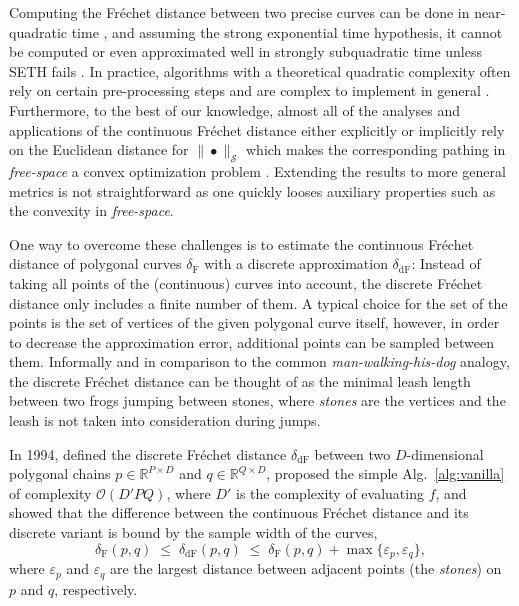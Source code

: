 Computing the Fr\'echet distance between two precise curves can be done in near-quadratic time \citep{agarwal14,alt95,buchin17}, and assuming the strong exponential time hypothesis, it cannot be computed or even approximated well in strongly subquadratic time unless SETH fails \citep{bringmann14,buchin19a}.
In practice, algorithms with a theoretical quadratic complexity often rely on certain pre-processing steps and are complex to implement in general \citep{bringmann19}.
Furthermore, to the best of our knowledge, almost all of the analyses and applications of the continuous Fr\'echet distance either explicitly or implicitly rely on the Euclidean distance for $\| \bullet \|_\mathcal{S}$ which makes the corresponding pathing in \textit{free-space} a convex optimization problem \citep{alt92,alt95}.
Extending the results to more general metrics is not straightforward as one quickly looses auxiliary properties such as the convexity in \textit{free-space}.

One way to overcome these challenges is to estimate the continuous Fr\'echet distance of polygonal curves $\delta_\mathrm{F}$ with a discrete approximation $\delta_\mathrm{dF}$:
Instead of taking all points of the (continuous) curves into account, the discrete Fr\'echet distance only includes a finite number of them.
A typical choice for the set of the points is the set of vertices of the given polygonal curve itself, however, in order to decrease the approximation error, additional points can be sampled between them.
Informally and in comparison to the common \textit{man-walking-his-dog} analogy, the discrete Fr\'echet distance can be thought of as the minimal leash length between two frogs jumping between stones, where \textit{stones} are the vertices and the leash is not taken into consideration during jumps.

In 1994, \citet{eiter94} defined the discrete Fr\'echet distance $\delta_\mathrm{dF}$ between two $D$-dimensional polygonal chains $p \in \mathbb{R}^{P \times D}$ and $q \in \mathbb{R}^{Q \times D}$, proposed the simple Alg.~\ref{alg:vanilla} of complexity $\mathcal{O}(D'PQ)$, where $D'$ is the complexity of evaluating $f$, and showed that the difference between the continuous Fr\'echet distance and its discrete variant is bound by the sample width of the curves,
\begin{equation*}
    \delta_\mathrm{F}(p, q) \;\le\; \delta_\mathrm{dF}(p, q) \;\le\; \delta_\mathrm{F}(p, q) + \max\{ \varepsilon_p, \varepsilon_q \},
\end{equation*}
where $\varepsilon_p$ and $\varepsilon_q$ are the largest distance between adjacent points (the \textit{stones}) on $p$ and $q$, respectively.

